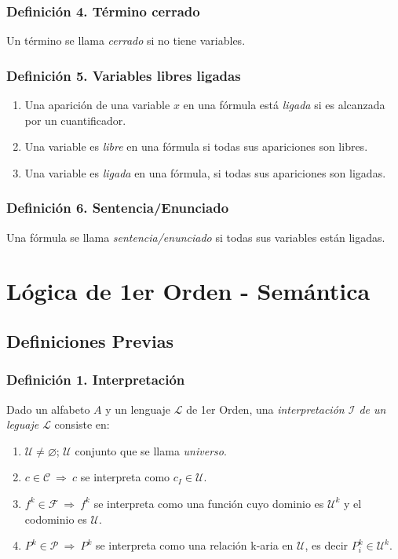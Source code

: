 \documentclass{article}
\newcommand{\partes}{\mathcal{P}}
\newcommand{\familia}{\mathcal{F}}                      %
\newcommand{\ctes}{\mathcal{C}}
\newcommand{\lenguaje}{\mathcal{L}}
\newcommand{\interpretacion}{\mathcal{I}}
\newcommand{\universo}{\mathcal{U}}
\newcommand{\Rightarrows}{\: \Rightarrow \:}            %
\begin{document}
\subsubsection*{Definición 4. Término cerrado}
Un término se llama \emph{cerrado} si no tiene variables.

\subsubsection*{Definición 5. Variables libres ligadas}
\begin{enumerate}
    \item Una aparición de una variable $x$ en una fórmula está \emph{ligada} si es alcanzada por un cuantificador.
    \item Una variable es \emph{libre} en una fórmula si todas sus apariciones son libres.
    \item Una variable es \emph{ligada} en una fórmula, si todas sus apariciones son ligadas.
\end{enumerate}

\subsubsection*{Definición 6. Sentencia/Enunciado}
Una fórmula se llama \emph{sentencia/enunciado} si todas sus variables están ligadas.


\newpage
\section{Lógica de 1er Orden - Semántica}
\subsection{Definiciones Previas}
\subsubsection*{Definición 1. Interpretación}
Dado un alfabeto $A$ y un lenguaje $\lenguaje$ de 1er Orden, una \emph{interpretación $\interpretacion$ de un  leguaje $\lenguaje$} consiste en:
\begin{enumerate}
    \item $\universo \neq \varnothing$; $\universo$ conjunto que se llama \emph{universo}.
    \item $c \in \ctes \Rightarrows c$ se interpreta como $c_I \in \universo$.
    \item $f^k \in \familia \Rightarrows f^k$ se interpreta como una función cuyo dominio es $\universo^k$ y el codominio es $\universo$.
    \item $P^k \in \partes \Rightarrows P^k$ se interpreta como una relación k-aria en $\universo$, es decir $P^k_i \in \universo^k$. 
\end{enumerate}
\end{document}
